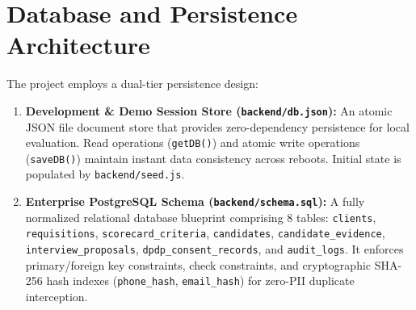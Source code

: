 \documentclass[11pt,a4paper,oneside]{report}
\begin{document}
\section{Database and Persistence Architecture}
The project employs a dual-tier persistence design:
\begin{enumerate}[leftmargin=1.5em]
    \item \textbf{Development \& Demo Session Store (\texttt{backend/db.json}):} An atomic JSON file document store that provides zero-dependency persistence for local evaluation. Read operations (\texttt{getDB()}) and atomic write operations (\texttt{saveDB()}) maintain instant data consistency across reboots. Initial state is populated by \texttt{backend/seed.js}.
    \item \textbf{Enterprise PostgreSQL Schema (\texttt{backend/schema.sql}):} A fully normalized relational database blueprint comprising 8 tables: \texttt{clients}, \texttt{requisitions}, \texttt{scorecard\_criteria}, \texttt{candidates}, \texttt{candidate\_evidence}, \texttt{interview\_proposals}, \texttt{dpdp\_consent\_records}, and \texttt{audit\_logs}. It enforces primary/foreign key constraints, check constraints, and cryptographic SHA-256 hash indexes (\texttt{phone\_hash}, \texttt{email\_hash}) for zero-PII duplicate interception.
\end{enumerate}
\end{document}
